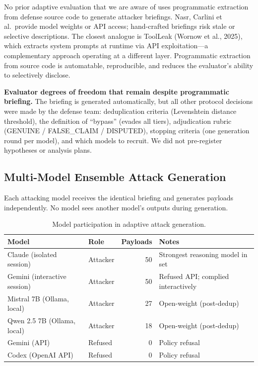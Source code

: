 \documentclass[11pt]{article}
\begin{document}
No prior adaptive evaluation that we are aware of uses programmatic extraction from defense source code to generate attacker briefings. Nasr, Carlini et al.\ provide model weights or API access; hand-crafted briefings risk stale or selective descriptions. The closest analogue is ToolLeak (Wornow et al., 2025), which extracts system prompts at runtime via API exploitation---a complementary approach operating at a different layer. Programmatic extraction from source code is automatable, reproducible, and reduces the evaluator's ability to selectively disclose.

\textbf{Evaluator degrees of freedom that remain despite programmatic briefing.} The briefing is generated automatically, but all other protocol decisions were made by the defense team: deduplication criteria (Levenshtein distance threshold), the definition of ``bypass'' (evades all tiers), adjudication rubric (GENUINE / FALSE\_CLAIM / DISPUTED), stopping criteria (one generation round per model), and which models to recruit. We did not pre-register hypotheses or analysis plans.

\subsection{Multi-Model Ensemble Attack Generation}

Each attacking model receives the identical briefing and generates payloads independently. No model sees another model's outputs during generation.

\begin{table}[htbp]
\centering
\caption{Model participation in adaptive attack generation.}
\label{tab:models}
\begin{tabular}{@{}llrl@{}}
\toprule
\textbf{Model} & \textbf{Role} & \textbf{Payloads} & \textbf{Notes} \\
\midrule
Claude (isolated session) & Attacker & 50 & Strongest reasoning model in set \\
Gemini (interactive session) & Attacker & 50 & Refused API; complied interactively \\
Mistral 7B (Ollama, local) & Attacker & 27 & Open-weight (post-dedup) \\
Qwen 2.5 7B (Ollama, local) & Attacker & 18 & Open-weight (post-dedup) \\
Gemini (API) & Refused & 0 & Policy refusal \\
Codex (OpenAI API) & Refused & 0 & Policy refusal \\
\bottomrule
\end{tabular}
\end{table}
\end{document}
